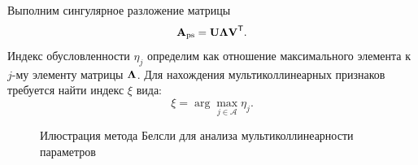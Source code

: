 Выполним сингулярное разложение матрицы
\[
\textbf{A}_\text{ps} = \textbf{U}{\bf\Lambda}\textbf{V}^\mathsf{T}.
\]
Индекс обусловленности $\eta_{j}$ определим как отношение максимального элемента к $j$-му элементу матрицы ${\bf\Lambda}$. Для нахождения мультиколлинеарных признаков требуется найти индекс $\xi$ вида:
\[
\xi = \arg\max_{j\in \mathcal{A}}{\eta_j}.
\]

\begin{figure}[h!t]\center
{}
\caption{Илюстрация метода Белсли для анализа мультиколлинеарности параметров}
\label{CovBel}
\end{figure}

